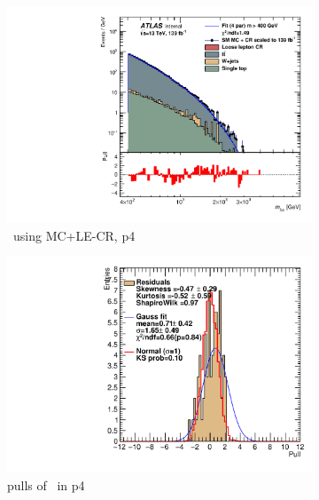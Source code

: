 \begin{figure}[H]
    \centering
    \begin{subfigure}[h]{0.38\linewidth}
    \includegraphics[scale=0.3]{figs/ch6/fit/variable_nosmooth/p4/10PB/output_SMMCplusCR_Mbm_p4.pdf}%
    \caption{\mbmu \ using MC+LE-CR, p4}
    \end{subfigure}
    \hfill
    \begin{subfigure}[h]{0.4\linewidth}
    \includegraphics[scale=0.32]{figs/ch6/fit/variable_nosmooth/p4/10PB/pull_SMMCplusCR_Mbm_p4.pdf}%
    \caption{pulls of \mbmu \ in p4}
    \end{subfigure}
    \hfill
    \begin{subfigure}[h]{0.38\linewidth}

\end{subfigure}
\end{figure}
